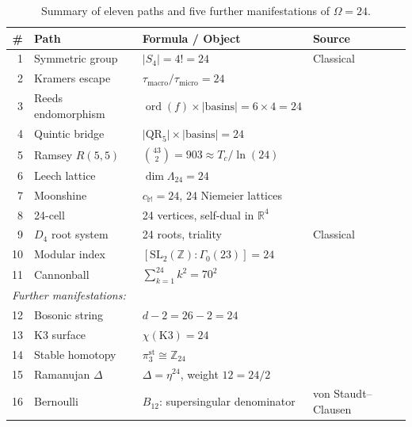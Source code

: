 \documentclass[11pt,a4paper]{article}
\theoremstyle{plain}
\theoremstyle{remark}
\renewcommand{\Omega}{\varOmega}
\newcommand{\Z}{\mathbb{Z}}
\newcommand{\R}{\mathbb{R}}
\newcommand{\abs}[1]{\lvert #1 \rvert}
\newcommand{\ord}{\operatorname{ord}}
\newcommand{\SL}{\mathrm{SL}}
\begin{document}
\medskip

\begin{table}[H]
\centering
\caption{Summary of eleven paths and five further manifestations of $\Omega=24$.}
\label{tab:paths}
\smallskip
\begin{tabular}{rlll}
\toprule
\textbf{\#} & \textbf{Path} & \textbf{Formula / Object} & \textbf{Source} \\
\midrule
1 & Symmetric group & $\abs{S_4}=4!=24$ & Classical \\
2 & Kramers escape & $\tau_{\mathrm{macro}}/\tau_{\mathrm{micro}}=24$ & \cite{DHR2026a} \\
3 & Reeds endomorphism & $\ord(f)\times\abs{\text{basins}}=6\times 4=24$ & \cite{reeds2006} \\
4 & Quintic bridge & $\abs{\mathrm{QR}_5}\times\abs{\text{basins}}=24$ & \cite{DHR2026a} \\
5 & Ramsey $R(5,5)$ & $\binom{43}{2}=903\approx T_c/\!\ln(24)$ & \cite{isomorphic-engine2026} \\
6 & Leech lattice & $\dim\Lambda_{24}=24$ & \cite{conway-sloane1999} \\
7 & Moonshine & $c_{\mathbb{M}}=24$, 24 Niemeier lattices & \cite{frenkel-lepowsky-meurman1988} \\
8 & 24-cell & 24 vertices, self-dual in $\R^4$ & \cite{coxeter1973} \\
9 & $D_4$ root system & 24 roots, triality & Classical \\
10 & Modular index & $[\SL_2(\Z):\Gamma_0(23)]=24$ & \cite{selberg1956} \\
11 & Cannonball & $\sum_{k=1}^{24}k^2=70^2$ & \cite{lucas1875} \\
\midrule
\multicolumn{4}{l}{\textit{Further manifestations:}} \\
12 & Bosonic string & $d-2=26-2=24$ & \cite{green-schwarz-witten1987} \\
13 & K3 surface & $\chi(\mathrm{K3})=24$ & \cite{huybrechts2016} \\
14 & Stable homotopy & $\pi_3^{\mathrm{st}}\cong\Z_{24}$ & \cite{ravenel1986} \\
15 & Ramanujan $\Delta$ & $\Delta=\eta^{24}$, weight $12=24/2$ & \cite{ramanujan1916} \\
16 & Bernoulli & $B_{12}$: supersingular denominator & von Staudt--Clausen \\
\bottomrule
\end{tabular}
\end{table}


\end{document}
